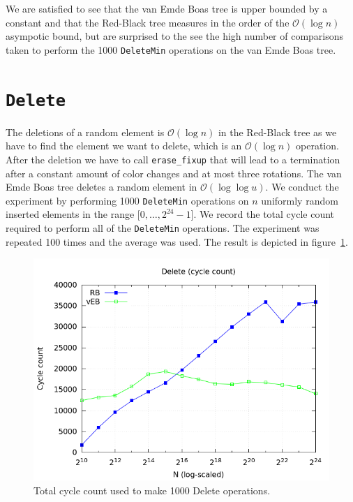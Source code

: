 \documentclass[a4paper,oneside,article,11pt]{memoir}
\begin{document}
We are satisfied to see that the van Emde Boas tree is upper bounded by a constant and that the Red-Black tree measures in the order of the $\mathcal{O}(\log n)$ asympotic bound, but are surprised to the see the high number of comparisons taken to perform the 1000 \texttt{DeleteMin} operations on the van Emde Boas tree.

\section{\texttt{Delete}}
The deletions of a random element is $\mathcal{O}(\log n)$ in the Red-Black tree as we have to find the element we want to delete, which is an $\mathcal{O}(\log n)$ operation. After the deletion we have to call \texttt{erase\_fixup} that will lead to a termination after a constant amount of color changes and at most three rotations. The van Emde Boas tree deletes a random element in $\mathcal{O}(\log \log u)$. We conduct the experiment by performing 1000  \texttt{DeleteMin} operations on $n$ uniformly random inserted elements in the range $[0, \dots, 2^{24}-1$]. We record the total cycle count required to perform all of the \texttt{DeleteMin} operations. The experiment was repeated 100 times and the average was used. The result is depicted in figure~\ref{fig:rbveb_delete_cyc.png}.

\begin{figure}[H]
\includegraphics[scale=0.5]{../res/rbveb/rbveb_delete_cyc.png}
\caption{Total cycle count used to make 1000 Delete operations.}
\label{fig:rbveb_delete_cyc.png}
\end{figure}
\end{document}
